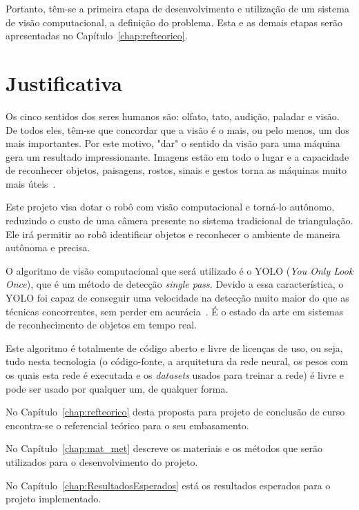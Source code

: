 Portanto, têm-se a primeira etapa de desenvolvimento e utilização de um sistema de visão computacional, a definição do problema. Esta e as demais etapas serão apresentadas no Capítulo~\ref{chap:refteorico}.

\section{Justificativa}
\label{sec:justi}

Os cinco sentidos dos seres humanos são: olfato, tato, audição, paladar e visão. De todos eles, têm-se que concordar que a visão é o mais, ou pelo menos, um dos mais importantes. Por este motivo, "dar" o sentido da visão para uma máquina gera um resultado impressionante. Imagens estão em todo o lugar e a capacidade de reconhecer objetos, paisagens, rostos, sinais e gestos torna as máquinas muito mais úteis~\cite{antonello2014introduccao}.

Este projeto visa dotar o robô com visão computacional e torná-lo autônomo, reduzindo o custo de uma câmera presente no sistema tradicional de triangulação. Ele irá permitir ao robô identificar objetos e reconhecer o ambiente de maneira autônoma e precisa.

O algoritmo de visão computacional que será utilizado é o YOLO (\textit{You Only Look Once}), que é um método de detecção \textit{single pass}. Devido a essa característica, o YOLO foi capaz de conseguir uma velocidade na detecção muito maior do que as técnicas concorrentes, sem perder em acurácia~\cite{alvesGabriel2020}. É o estado da arte em sistemas de reconhecimento de objetos em tempo real.

Este algoritmo é totalmente de código aberto e livre de licenças de uso, ou seja, tudo nesta tecnologia (o código-fonte, a arquitetura da rede neural, os pesos com os quais esta rede é executada e os \textit{datasets} usados para treinar a rede) é livre e pode ser usado por qualquer um, de qualquer forma.

No Capítulo~\ref{chap:refteorico} desta proposta para projeto de conclusão de curso encontra-se o referencial teórico para o seu embasamento.

No Capítulo~\ref{chap:mat_met} descreve os materiais e os métodos que serão utilizados para o desenvolvimento do projeto.

No Capítulo~\ref{chap:ResultadosEsperados} está os resultados esperados para o projeto implementado.

